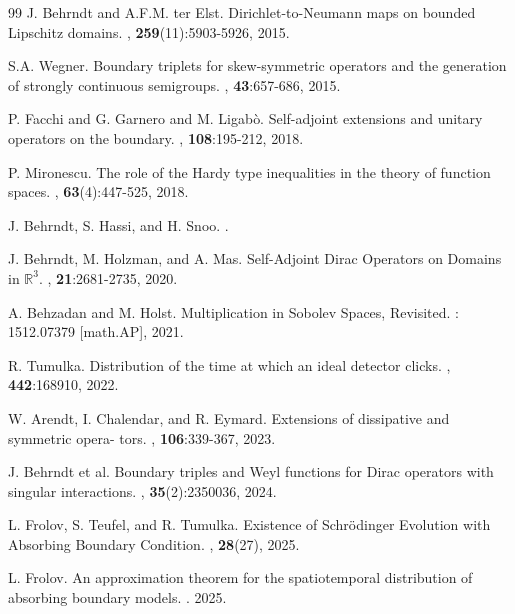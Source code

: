 \documentclass{article}
\numberwithin{equation}{section}
\begin{document}
\begin{thebibliography}{99}
J. Behrndt and A.F.M. ter Elst. \newblock Dirichlet-to-Neumann maps on bounded Lipschitz domains.
, \textbf{259}(11):5903-5926, 2015.

S.A. Wegner. \newblock Boundary triplets for skew-symmetric operators and the generation of strongly
continuous semigroups.
, \textbf{43}:657-686, 2015.

P. Facchi and G. Garnero and M. Ligabò. \newblock  Self-adjoint extensions and unitary operators on the boundary.
, \textbf{108}:195-212, 2018.

P. Mironescu. \newblock The role of the Hardy type inequalities in the theory of function spaces.
, \textbf{63}(4):447-525, 2018.

J. Behrndt, S. Hassi, and H. Snoo.
.

J. Behrndt, M. Holzman, and A. Mas. \newblock Self-Adjoint Dirac Operators on Domains in $\mathbb {R}^3$.
, \textbf{21}:2681-2735, 2020.

A. Behzadan and M. Holst. \newblock Multiplication in Sobolev Spaces, Revisited.
: 1512.07379 [math.AP], 2021.

R. Tumulka. \newblock Distribution of the time at which an ideal detector clicks.
, \textbf{442}:168910, 2022.

W. Arendt, I. Chalendar, and R. Eymard. \newblock Extensions of dissipative and symmetric opera-
tors.
, \textbf{106}:339-367, 2023.

J. Behrndt et al. \newblock Boundary triples and Weyl functions for Dirac operators with singular
interactions.
, \textbf{35}(2):2350036, 2024.

L. Frolov, S. Teufel, and R. Tumulka. \newblock Existence of Schr\"odinger Evolution with Absorbing Boundary Condition.
, \textbf{28}(27), 2025.

L. Frolov. \newblock An approximation theorem for the spatiotemporal distribution of absorbing boundary models.
. 2025.

\end{thebibliography}
\end{document}
